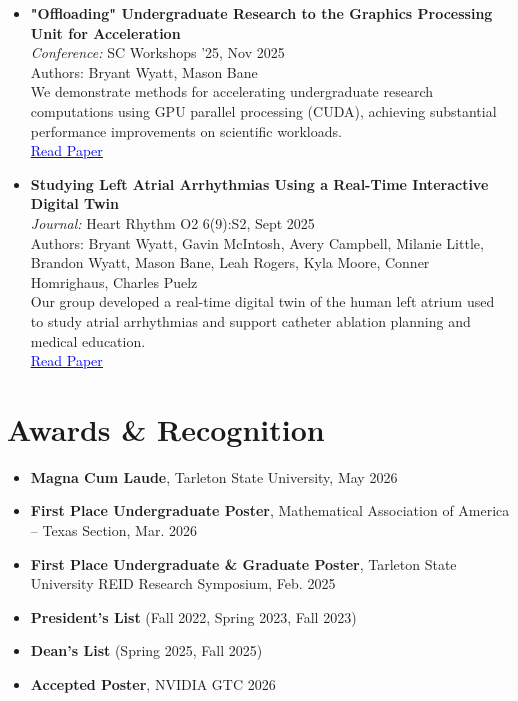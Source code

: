 \documentclass[letterpaper,11pt]{article}
\begin{document}
\begin{itemize}
    \item \textbf{"Offloading" Undergraduate Research to the Graphics Processing Unit for Acceleration} \\
      \textit{Conference:} SC Workshops '25, Nov 2025 \\
      Authors: Bryant Wyatt, Mason Bane \\
      We demonstrate methods for accelerating undergraduate research computations using GPU parallel processing (CUDA), achieving substantial performance improvements on scientific workloads. \\
      \href{https://dl.acm.org/doi/10.1145/3731599.3767382}{\textcolor{blue}{\underline{Read Paper}}}
    \item \textbf{Studying Left Atrial Arrhythmias Using a Real-Time Interactive Digital Twin} \\
      \textit{Journal:} Heart Rhythm O2 6(9):S2, Sept 2025 \\
      Authors: Bryant Wyatt, Gavin McIntosh, Avery Campbell, Milanie Little, Brandon Wyatt, Mason Bane, Leah Rogers, Kyla Moore, Conner Homrighaus, Charles Puelz \\
      Our group developed a real-time digital twin of the human left atrium used to study atrial arrhythmias and support catheter ablation planning and medical education. \\
      \href{https://doi.org/10.1016/j.hroo.2025.07.027}{\textcolor{blue}{\underline{Read Paper}}}
  \end{itemize}

\section{Awards \& Recognition}
  \begin{itemize}
    \item \textbf{Magna Cum Laude}, Tarleton State University, May 2026
    \item \textbf{First Place Undergraduate Poster}, Mathematical Association of America -- Texas Section, Mar. 2026
    \item \textbf{First Place Undergraduate \& Graduate Poster}, Tarleton State University REID Research Symposium, Feb. 2025
    \item \textbf{President's List} (Fall 2022, Spring 2023, Fall 2023)
    \item \textbf{Dean's List} (Spring 2025, Fall 2025)
    \item \textbf{Accepted Poster}, NVIDIA GTC 2026
  \end{itemize}
\end{document}
